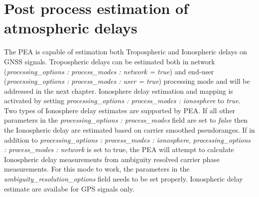 \section{Post process estimation of atmospheric delays}
The PEA is capable of estimation both Tropospheric and Ionospheric delays on GNSS signals.
Tropospheric delays can be estimated both in network (\textit{processing\_options : process\_modes : network = true}) and end-user (\textit{processing\_options : process\_modes : user = true}) processing mode and will be addressed in the next chapter.
Ionosphere delay estimation and mapping is activated by setting \textit{processing\_options : process\_modes : ionosphere} to \textit{true}.
Two types of Ionosphere delay estimates are supported by PEA. 
If all other parameters in the \textit{processing\_options : process\_modes} field are set to \textit{false} then the Ionospheric delay are estimated based on carrier smoothed pseudoranges.
If in addition to \textit{processing\_options : process\_modes : ionosphere}, \textit{processing\_options : process\_modes : network} is set to true, the PEA will attempt to calculate Ionospheric delay measurements from ambiguity resolved carrier phase measurements. For this mode to work, the parameters in the \textit{ambiguity\_resolution\_options} field needs to be set properly.
Ionospheric delay estimate are availabe for GPS signals only.\\

